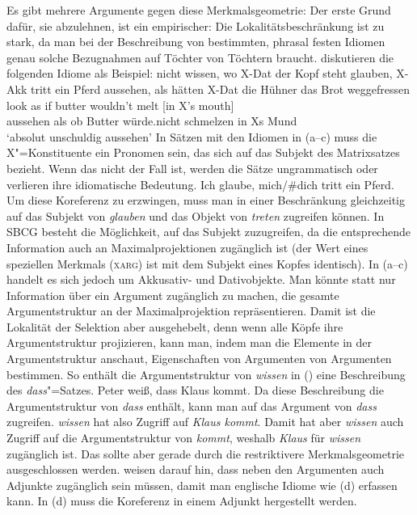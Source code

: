 Es gibt mehrere Argumente gegen diese Merkmalsgeometrie: Der erste Grund dafür, sie abzulehnen, ist ein empirischer: Die
Lokalitätsbeschränkung ist zu stark, da man bei der Beschreibung von bestimmten, phrasal festen
Idiomen genau solche Bezugnahmen auf Töchter von Töchtern braucht.  diskutieren die folgenden Idiome als
Beispiel:
\eal
\ex nicht wissen, wo X-Dat der Kopf steht
\ex\label{mich-tritt-ein-Pferd}
glauben, X-Akk tritt ein Pferd
\ex aussehen, als hätten X-Dat die Hühner das Brot weggefressen
\ex
\gll look as if butter wouldn't melt [in X's mouth]\\
     aussehen als ob Butter würde.nicht schmelzen \hphantom{[}in Xs Mund\\
\glt `absolut unschuldig aussehen'
\zl
In Sätzen mit den Idiomen in (a--c) muss die X"=Konstituente ein Pronomen sein, das sich auf
das Subjekt des Matrixsatzes bezieht. Wenn das nicht der Fall ist, werden die Sätze ungrammatisch
oder verlieren ihre idiomatische Bedeutung.
\ea
Ich glaube, mich/\#dich tritt ein Pferd.
\z
Um diese Koreferenz zu erzwingen, muss man in einer Beschränkung gleichzeitig auf das Subjekt von
\emph{glauben} und das Objekt von \emph{treten} zugreifen können. In SBCG besteht die Möglichkeit,
auf das Subjekt zuzugreifen, da die entsprechende Information auch an Maximalprojektionen zugänglich
ist (der Wert eines speziellen Merkmals (\textsc{xarg}) ist mit dem Subjekt eines Kopfes identisch). In
(a--c) handelt es sich jedoch um Akkusativ- und Dativobjekte. Man könnte statt nur
Information über ein Argument zugänglich zu machen, die gesamte Argumentstruktur an der
Maximalprojektion repräsentieren. Damit ist die Lokalität der Selektion aber ausgehebelt, denn wenn
alle Köpfe ihre Argumentstruktur projizieren, kann man, indem man die Elemente in der
Argumentstruktur anschaut, Eigenschaften von Argumenten von Argumenten bestimmen. So enthält \zb die
Argumentstruktur von \emph{wissen} in () eine Beschreibung des \emph{dass}"=Satzes.
\ea
Peter weiß, dass Klaus kommt.
\z
Da diese Beschreibung die Argumentstruktur von \emph{dass} enthält, kann man auf das Argument von
\emph{dass} zugreifen. \emph{wissen} hat also Zugriff auf \emph{Klaus kommt}. Damit hat aber
\emph{wissen} auch Zugriff auf die Argumentstruktur von \emph{kommt}, weshalb \emph{Klaus} für
\emph{wissen} zugänglich ist. Das sollte aber gerade durch die restriktivere Merkmalsgeometrie
ausgeschlossen werden. \citeauthor{RS2009a} weisen darauf hin, dass neben den Argumenten auch Adjunkte
zugänglich sein müssen, damit man englische Idiome wie (d) erfassen kann. In (d)
muss die Koreferenz in einem Adjunkt hergestellt werden.


